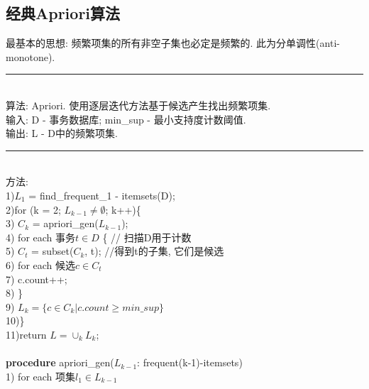 \documentclass[a4paper,10pt,english]{article}
\begin{document}
\subsection{经典Apriori算法}
最基本的思想: 频繁项集的所有非空子集也必定是频繁的. 此为分单调性(anti-monotone).
\rule{16cm}{1pt} \\
算法: Apriori. 使用逐层迭代方法基于候选产生找出频繁项集. \\
输入: D - 事务数据库; min\_sup - 最小支持度计数阈值. \\
输出: L - D中的频繁项集.\\
\rule{16cm}{1pt} \\
方法: \\
1)\hspace{3em}$L_1$ = find\_frequent\_1 - itemsets(D);      \\
2)\hspace{3em}for (k = 2; $L_{k-1} \ne \emptyset$; k++)\{    \\
3)\hspace{6em}    $C_k$ = apriori\_gen($L_{k-1}$);          \\
4)\hspace{6em}    for each 事务$t \in D$ \{      // 扫描D用于计数        \\
5)\hspace{9em}        $C_t$ = subset($C_k$, t); //得到t的子集, 它们是候选       \\
6)\hspace{9em}        for each 候选$c \in C_t$                            \\
7)\hspace{12em}            c.count++;                                    \\
8)\hspace{6em}    \}                                                      \\
9)\hspace{6em}    $L_k = \{c \in C_k | c.count \ge min\_sup \}$              \\
10)\hspace{3em}\}                                                          \\
11)\hspace{3em}return $L = \cup_k L_k$;                                   \\
\\
\textbf{procedure} apriori\_gen($L_{k-1}$: frequent(k-1)-itemsets)\\
1)\hspace{3em}    for each 项集$l_1 \in L_{k-1}$\\
\end{document}
